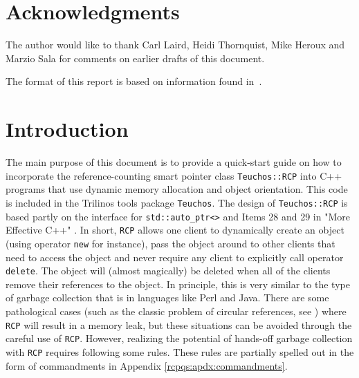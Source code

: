 \documentclass[pdf,ps2pdf,11pt]{SANDreport}
\begin{document}
\section*{Acknowledgments}

The author would like to thank Carl Laird, Heidi Thornquist, Mike
Heroux and Marzio Sala for comments on earlier drafts of this
document.

The format of this report is based on information found
in~\cite{Sand98-0730}.

%
\clearpage
\tableofcontents

%
\SANDmain %

%
\section{Introduction}
%

The main purpose of this document is to provide a quick-start guide on
how to incorporate the reference-counting smart pointer class
{}\texttt{Teuchos\-::RCP} into C++ programs that use
dynamic memory allocation and object orientation.  This code is
included in the Trilinos {}\cite{ref:Trilinos-Overview} tools package
{}\texttt{Teuchos}.  The design of
{}\texttt{Teuchos\-::RCP} is based partly on the
interface for {}\texttt{std\-::auto\-\_ptr<>} and Items 28 and 29 in
"More Effective C++" {}\cite{ref:meyers_1996}.  In short,
{}\texttt{RCP} allows one client to dynamically create
an object (using operator {}\texttt{new} for instance), pass the
object around to other clients that need to access the object and
never require any client to explicitly call operator
{}\texttt{delete}.  The object will (almost magically) be deleted when
all of the clients remove their references to the object.  In
principle, this is very similar to the type of garbage collection that
is in languages like Perl and Java.  There are some pathological cases
(such as the classic problem of circular references, see {}\cite[Item
29, page 212]{ref:meyers_1996}) where {}\texttt{RCP}
will result in a memory leak, but these situations can be avoided
through the careful use of {}\texttt{RCP}.  However,
realizing the potential of hands-off garbage collection with
{}\texttt{RCP} requires following some rules.  These
rules are partially spelled out in the form of commandments in
Appendix {}\ref{rcpqs:apdx:commandments}.
\end{document}
